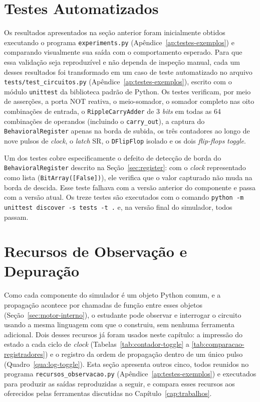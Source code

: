 \section{Testes Automatizados}
\label{sec:testes}

Os resultados apresentados na seção anterior foram inicialmente obtidos executando o programa \texttt{experiments.py} (Apêndice~\ref{ap:testes-exemplos}) e comparando visualmente sua saída com o comportamento esperado. Para que essa validação seja reproduzível e não dependa de inspeção manual, cada um desses resultados foi transformado em um caso de teste automatizado no arquivo \texttt{tests/test\_circuitos.py} (Apêndice~\ref{ap:testes-exemplos}), escrito com o módulo \texttt{unittest} da biblioteca padrão de Python. Os testes verificam, por meio de asserções, a porta NOT reativa, o meio-somador, o somador completo nas oito combinações de entrada, o \texttt{RippleCarryAdder} de 3 \textit{bits} em todas as 64 combinações de operandos (incluindo o \texttt{carry\_out}), a captura do \texttt{BehavioralRegister} apenas na borda de subida, os três contadores ao longo de nove pulsos de \textit{clock}, o \textit{latch} SR, o \texttt{DFlipFlop} isolado e os dois \textit{flip-flops} \textit{toggle}.

Um dos testes cobre especificamente o defeito de detecção de borda do \texttt{BehavioralRegister} descrito na Seção~\ref{sec:register}: com o \textit{clock} representado como lista (\texttt{BitArray([False])}), ele verifica que o valor capturado não muda na borda de descida. Esse teste falhava com a versão anterior do componente e passa com a versão atual. Os treze testes são executados com o comando \texttt{python -m unittest discover -s tests -t .} e, na versão final do simulador, todos passam.

\section{Recursos de Observação e Depuração}
\label{sec:observacao}

Como cada componente do simulador é um objeto Python comum, e a propagação acontece por chamadas de função entre esses objetos (Seção~\ref{sec:motor-interno}), o estudante pode observar e interrogar o circuito usando a mesma linguagem com que o construiu, sem nenhuma ferramenta adicional. Dois desses recursos já foram usados neste capítulo: a impressão do estado a cada ciclo de \textit{clock} (Tabelas~\ref{tab:contador-toggle} a \ref{tab:comparacao-registradores}) e o registro da ordem de propagação dentro de um único pulso (Quadro~\ref{qua:log-toggle}). Esta seção apresenta outros cinco, todos reunidos no programa \texttt{recursos\_observacao.py} (Apêndice~\ref{ap:testes-exemplos}) e executados para produzir as saídas reproduzidas a seguir, e compara esses recursos aos oferecidos pelas ferramentas discutidas no Capítulo~\ref{cap:trabalhos}.

